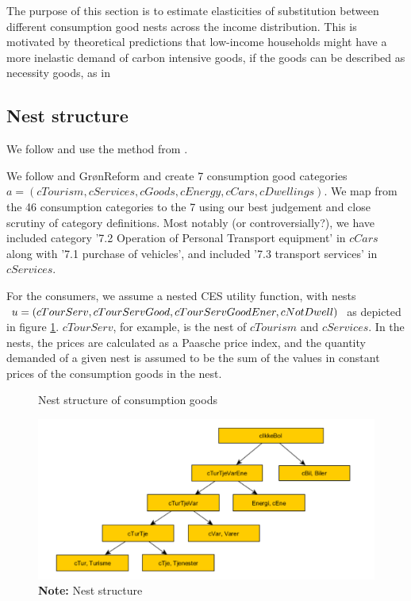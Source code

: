 The purpose of this section is to estimate elasticities of substitution between different consumption good nests across the income distribution. This is motivated by theoretical predictions that low-income households might have a more inelastic demand of carbon intensive goods, if the goods can be described as necessity goods, as in \cite{klenert2018}

\subsection{Nest structure}
We follow \cite{makroforbrug2020} and use the method from \cite{CESkalmanmethod}. 

We follow \cite{makroforbrug2020} and GrønReform and create 7 consumption good categories $a=(cTourism, cServices, cGoods, cEnergy, cCars ,cDwellings)$. We map from the 46 consumption categories to the 7 using our best judgement and close scrutiny of category definitions. Most notably (or controversially?), we have included category '7.2 Operation of Personal Transport equipment' in $cCars$ along with '7.1 purchase of vehicles', and included '7.3 transport services' in $cServices$. 

For the consumers, we assume a nested CES utility function, with nests $u=(cTourServ, \\ cTourServGood, cTourServGoodEner,cNotDwell)$ as depicted in figure \ref{fignest}. $cTourServ$, for example, is the nest of $cTourism$ and $cServices$. In the nests, the prices are calculated as a Paasche price index, and the quantity demanded of a given nest is assumed to be the sum of the values in constant prices of the consumption goods in the nest. 

\begin{figure}[]
\centering
\caption{Nest structure of consumption goods}
\label{fignest}
\includegraphics[width=\textwidth]{Figures/nests.png}
\captionsetup{singlelinecheck=off,size=scriptsize}
\setlength{\captionmargin}{10pt}
\caption*{
\textbf{Note:} Nest structure\\}
\end{figure}

